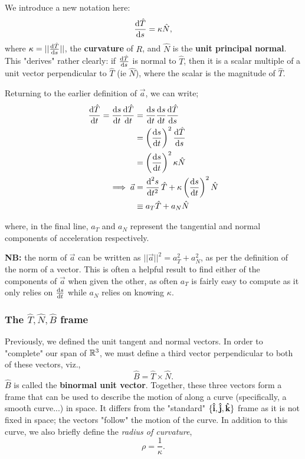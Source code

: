 \documentclass[12pt]{article}
\begin{document}
{We introduce a new notation here: \[\frac{\text{d}\hat{T}}{\text{d}s} = \kappa \hat{N},\] where $\kappa = ||\frac{\text{d}\hat{T}}{\text{d}s}||$, the \textbf{curvature} of $R$, and $\hat{N}$ is the \textbf{unit principal normal}. This "derives" rather clearly: if $\frac{\text{d}\hat{T}}{\text{d}s}$ is normal to $\hat{T}$, then it is a scalar multiple of a unit vector perpendicular to $\hat{T}$ (ie $\hat{N}$), where the scalar is the magnitude of $\hat{T}$.

Returning to the earlier definition of $\vec{a}$, we can write;
\begin{align*}
    \frac{\text{d}\hat{T}}{\text{d}t} = \frac{\text{d}s}{\text{d}t}\frac{\text{d}\hat{T}}{\text{d}t} &= \frac{\text{d}s}{\text{d}t}\frac{\text{d}s}{\text{d}t}\frac{\text{d}\hat{T}}{\text{d}s}\\
    &= \left(\frac{\text{d}s}{\text{d}t}\right)^2 \frac{\text{d}\hat{T}}{\text{d}s}\\
    &= \left(\frac{\text{d}s}{\text{d}t}\right)^2 \kappa \hat{N}\\
    \implies \vec{a} &= \frac{\text{d}^2s}{\text{d}t^2}\, \hat{T} + \kappa \left(\frac{\text{d}s}{\text{d}t}\right)^2 \hat{N}\\
    &\equiv a_T \hat{T} + a_N \hat{N}
\end{align*}

where, in the final line, $a_T$ and $a_N$ represent the tangential and normal components of acceleration respectively.

\textbf{NB:} the norm of $\vec{a}$ can be written as $||\vec{a}||^2 = a_T^2+a_N^2$, as per the definition of the norm of a vector. This is often a helpful result to find either of the components of $\vec{a}$ when given the other, as often $a_T$ is fairly easy to compute as it only relies on $\frac{\text{d}s}{\text{d}t}$ while $a_N$ relies on knowing $\kappa$.
\subsubsection{The \texorpdfstring{$\hat{T}, \hat{N}, \hat{B}$}{T, N, B} frame}

Previously, we defined the unit tangent and normal vectors. In order to "complete" our span of $\mathbb{R}^3$, we must define a third vector perpendicular to both of these vectors, viz., \[\hat{B} = \hat{T} \times \hat{N}.\] $\hat{B}$ is called the \textbf{binormal unit vector}. Together, these three vectors form a frame that can be used to describe the motion of along a curve (specifically, a smooth curve...) in space. It differs from the "standard" $\{\vu{i}, \vu{j},\vu{k}\}$ frame as it is not fixed in space; the vectors "follow" the motion of the curve. In addition to this curve, we also briefly define the \textit{radius of curvature}, \[\rho = \frac{1}{\kappa}.\]

}
\end{document}
